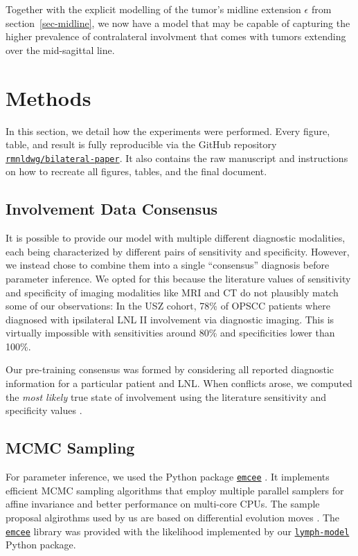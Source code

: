 \documentclass[
  sn-mathphys-num,
]{sn-jnl}
\begin{document}
Together with the explicit modelling of the tumor's midline extension
\(\epsilon\) from section~\ref{sec-midline}, we now have a model that
may be capable of capturing the higher prevalence of contralateral
involvment that comes with tumors extending over the mid-sagittal line.

\section{Methods}\label{sec-methods}

In this section, we detail how the experiments were performed. Every
figure, table, and result is fully reproducible via the GitHub
repository
\href{https://github.com/rmnldwg/bilateral-paper}{\texttt{rmnldwg/bilateral-paper}}.
It also contains the raw manuscript and instructions on how to recreate
all figures, tables, and the final document.

\subsection{Involvement Data
Consensus}\label{involvement-data-consensus}

It is possible to provide our model with multiple different diagnostic
modalities, each being characterized by different pairs of sensitivity
and specificity. However, we instead chose to combine them into a single
``consensus'' diagnosis before parameter inference. We opted for this
because the literature values of sensitivity and specificity
\citep{de_bondt_detection_2007, kyzas_18f-fluorodeoxyglucose_2008} of
imaging modalities like MRI and CT do not plausibly match some of our
observations: In the USZ cohort, 78\% of OPSCC patients where diagnosed
with ipsilateral LNL II involvement via diagnostic imaging. This is
virtually impossible with sensitivities around 80\% and specificities
lower than 100\%.

Our pre-training consensus was formed by considering all reported
diagnostic information for a particular patient and LNL. When conflicts
arose, we computed the \emph{most likely} true state of involvement
using the literature sensitivity and specificity values
\citep{de_bondt_detection_2007, kyzas_18f-fluorodeoxyglucose_2008}.

\subsection{MCMC Sampling}\label{sec-sampling}

For parameter inference, we used the Python package
\href{https://emcee.readthedocs.io/en/stable/}{\texttt{emcee}}
\citep{foreman-mackey_emcee_2013}. It implements efficient MCMC sampling
algorithms that employ multiple parallel samplers for affine invariance
and better performance on multi-core CPUs. The sample proposal
algirothms used by us are based on differential evolution moves
\citep{ter_braak_differential_2008, nelson_run_2013}. The
\href{https://emcee.readthedocs.io/en/stable/}{\texttt{emcee}} library
was provided with the likelihood implemented by our
\href{https://lymph-model.readthedocs.io/en/stable/}{\texttt{lymph-model}}
Python package.
\end{document}

